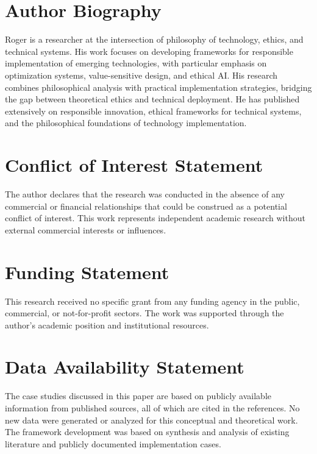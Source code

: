 \section*{Author Biography}
Roger is a researcher at the intersection of philosophy of technology, ethics, and technical systems. His work focuses on developing frameworks for responsible implementation of emerging technologies, with particular emphasis on optimization systems, value-sensitive design, and ethical AI. His research combines philosophical analysis with practical implementation strategies, bridging the gap between theoretical ethics and technical deployment. He has published extensively on responsible innovation, ethical frameworks for technical systems, and the philosophical foundations of technology implementation.

\section*{Conflict of Interest Statement}
The author declares that the research was conducted in the absence of any commercial or financial relationships that could be construed as a potential conflict of interest. This work represents independent academic research without external commercial interests or influences.

\section*{Funding Statement}
This research received no specific grant from any funding agency in the public, commercial, or not-for-profit sectors. The work was supported through the author's academic position and institutional resources.

\section*{Data Availability Statement}
The case studies discussed in this paper are based on publicly available information from published sources, all of which are cited in the references. No new data were generated or analyzed for this conceptual and theoretical work. The framework development was based on synthesis and analysis of existing literature and publicly documented implementation cases. 